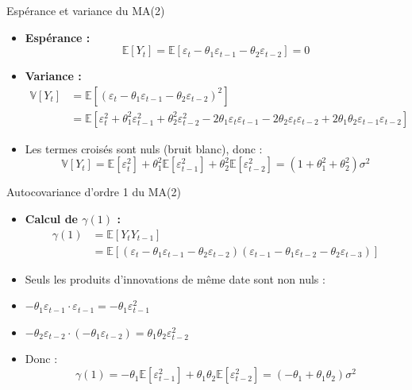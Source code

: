 \documentclass[11pt,aspectratio=169]{beamer}
\newcommand{\E}{\mathbb{E}}
\newcommand{\Var}{\mathbb{V}}
\begin{document}
\begin{frame}{Espérance et variance du MA(2)}

\begin{itemize}

\item \textbf{Espérance :}
\[
\E[Y_t] = \E[\varepsilon_t - \theta_1 \varepsilon_{t-1} - \theta_2 \varepsilon_{t-2}] = 0
\]

\item \textbf{Variance :}
\begin{align*}
\Var[Y_t] &= \E[(\varepsilon_t - \theta_1 \varepsilon_{t-1} - \theta_2 \varepsilon_{t-2})^2] \\
&= \E[\varepsilon_t^2 + \theta_1^2 \varepsilon_{t-1}^2 + \theta_2^2 \varepsilon_{t-2}^2 - 2\theta_1 \varepsilon_t \varepsilon_{t-1} - 2\theta_2 \varepsilon_t \varepsilon_{t-2} + 2\theta_1 \theta_2 \varepsilon_{t-1} \varepsilon_{t-2}]
\end{align*}

\item Les termes croisés sont nuls (bruit blanc), donc :
\[
\Var[Y_t] = \E[\varepsilon_t^2] + \theta_1^2 \E[\varepsilon_{t-1}^2] + \theta_2^2 \E[\varepsilon_{t-2}^2] = (1 + \theta_1^2 + \theta_2^2) \sigma^2
\]

\end{itemize}
\end{frame}

\begin{frame}{Autocovariance d'ordre 1 du MA(2)}

\begin{itemize}

\item \textbf{Calcul de $\gamma(1)$ :}
\begin{align*}
\gamma(1) &= \E[Y_t Y_{t-1}] \\
&= \E[(\varepsilon_t - \theta_1 \varepsilon_{t-1} - \theta_2 \varepsilon_{t-2})(\varepsilon_{t-1} - \theta_1 \varepsilon_{t-2} - \theta_2 \varepsilon_{t-3})]
\end{align*}

\item Seuls les produits d'innovations de même date sont non nuls :\newline

\item $-\theta_1 \varepsilon_{t-1} \cdot \varepsilon_{t-1} = -\theta_1 \varepsilon_{t-1}^2$\newline

\item $-\theta_2 \varepsilon_{t-2} \cdot (-\theta_1 \varepsilon_{t-2}) = \theta_1 \theta_2 \varepsilon_{t-2}^2$\newline

\item Donc :
\[
\gamma(1) = -\theta_1 \E[\varepsilon_{t-1}^2] + \theta_1 \theta_2 \E[\varepsilon_{t-2}^2] = (-\theta_1 + \theta_1 \theta_2) \sigma^2
\]

\end{itemize}
\end{frame}
\end{document}
